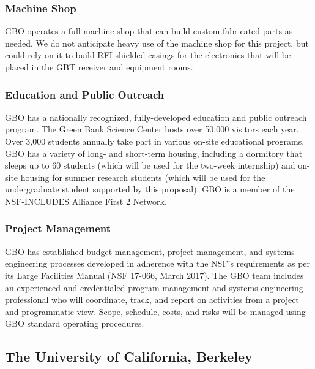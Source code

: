 \documentclass[10pt]{NSF}
\begin{document}
\subsubsection{Machine Shop}

GBO operates a full machine shop that can build custom fabricated
parts as needed.  We do not anticipate heavy use of the machine shop
for this project, but could rely on it to build RFI-shielded casings
for the electronics that will be placed in the GBT receiver and
equipment rooms.

\subsubsection{Education and Public Outreach}

GBO has a nationally recognized, fully-developed education and public
outreach program.  The Green Bank Science Center hosts over 50,000
visitors each year.  Over 3,000 students annually take part in various
on-site educational programs.  GBO has a variety of long- and
short-term housing, including a dormitory that sleeps up to 60
students (which will be used for the two-week internship) and on-site
housing for summer research students (which will be used for the
undergraduate student supported by this proposal).  GBO is a member of
the NSF-INCLUDES Alliance First 2 Network.

\subsubsection{Project Management}

GBO has established budget management, project management, and systems
engineering processes developed in adherence with the NSF's
requirements as per its Large Facilities Manual (NSF 17-066, March
2017). The GBO team includes an experienced and credentialed program
management and systems engineering professional who will coordinate,
track, and report on activities from a project and programmatic
view. Scope, schedule, costs, and risks will be managed using GBO
standard operating procedures.

\subsection{The University of California, Berkeley}
\end{document}
